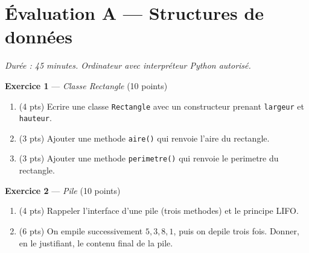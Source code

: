 \section*{Évaluation A --- Structures de données}
\textit{Durée : 45 minutes. Ordinateur avec interpréteur Python autorisé.}


\bigskip

\textbf{Exercice 1} --- \textit{Classe Rectangle} \hfill (10 points)

\begin{enumerate}
  \item (4 pts) Ecrire une classe \lstinline{Rectangle} avec un constructeur prenant \lstinline{largeur} et \lstinline{hauteur}.
  \item (3 pts) Ajouter une methode \lstinline{aire()} qui renvoie l'aire du rectangle.
  \item (3 pts) Ajouter une methode \lstinline{perimetre()} qui renvoie le perimetre du rectangle.
\end{enumerate}


\bigskip

\textbf{Exercice 2} --- \textit{Pile} \hfill (10 points)

\begin{enumerate}
  \item (4 pts) Rappeler l'interface d'une pile (trois methodes) et le principe LIFO.
  \item (6 pts) On empile successivement $5, 3, 8, 1$, puis on depile trois fois. Donner, en le justifiant, le contenu final de la pile.
\end{enumerate}
